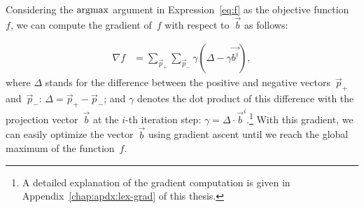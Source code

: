 
Considering the $\argmax$ argument in Expression~\ref{eq:f} as the
objective function~$f$, we can compute the gradient of~$f$ with
respect to~$\vec{b}$ as follows:

{\small%
  \begin{align}
    \nabla f &= \sum_{\vec{p}_+}\sum_{\vec{p}_-}%
               \gamma\left(\Delta - \gamma\vec{b^{i}}\right),\label{eq:prj-line-grad}%
\end{align}\normalsize}%
where $\Delta$ stands for the difference between the positive and
negative vectors~$\vec{p}_{+}$ and~$\vec{p}_{-}$:
$\Delta = \vec{p}_{+}-\vec{p}_{-}$; and $\gamma$ denotes the dot
product of this difference with the projection vector~$\vec{b}$ at the
$i$-th iteration step: $\gamma = \Delta \cdot \vec{b}^i$.\footnote{A
  detailed explanation of the gradient computation is given in
  Appendix~\ref{chap:apdx:lex-grad} of this thesis.}  With this
gradient, we can easily optimize the vector~$\vec{b}$ using gradient
ascent until we reach the global maximum of the function~$f$.



